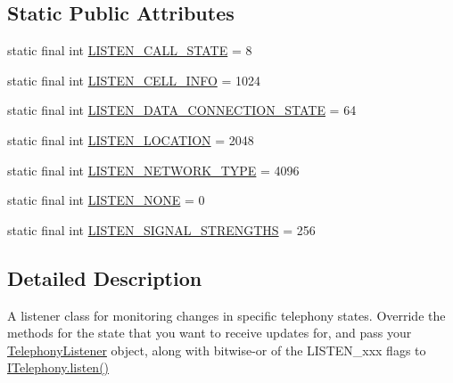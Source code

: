 \subsection*{Static Public Attributes}
\begin{DoxyCompactItemize}
\item 
static final int \hyperlink{classcom_1_1qualoutdoor_1_1recorder_1_1telephony_1_1TelephonyListener_a191d2575b8783002ee3e5d8cbadd6f34}{L\-I\-S\-T\-E\-N\-\_\-\-C\-A\-L\-L\-\_\-\-S\-T\-A\-T\-E} = 8
\item 
static final int \hyperlink{classcom_1_1qualoutdoor_1_1recorder_1_1telephony_1_1TelephonyListener_aa73af11a2afc13c7bfb8ce7e58b45f69}{L\-I\-S\-T\-E\-N\-\_\-\-C\-E\-L\-L\-\_\-\-I\-N\-F\-O} = 1024
\item 
static final int \hyperlink{classcom_1_1qualoutdoor_1_1recorder_1_1telephony_1_1TelephonyListener_a640f1efa08e7e0869335cfc47c3a2124}{L\-I\-S\-T\-E\-N\-\_\-\-D\-A\-T\-A\-\_\-\-C\-O\-N\-N\-E\-C\-T\-I\-O\-N\-\_\-\-S\-T\-A\-T\-E} = 64
\item 
static final int \hyperlink{classcom_1_1qualoutdoor_1_1recorder_1_1telephony_1_1TelephonyListener_a146371faf289ea1d3c019a9da50e6ba2}{L\-I\-S\-T\-E\-N\-\_\-\-L\-O\-C\-A\-T\-I\-O\-N} = 2048
\item 
static final int \hyperlink{classcom_1_1qualoutdoor_1_1recorder_1_1telephony_1_1TelephonyListener_adff97a5ff891440e844b1438c8160ec1}{L\-I\-S\-T\-E\-N\-\_\-\-N\-E\-T\-W\-O\-R\-K\-\_\-\-T\-Y\-P\-E} = 4096
\item 
static final int \hyperlink{classcom_1_1qualoutdoor_1_1recorder_1_1telephony_1_1TelephonyListener_a5d217cc158268f8c01738b0f51e1ce53}{L\-I\-S\-T\-E\-N\-\_\-\-N\-O\-N\-E} = 0
\item 
static final int \hyperlink{classcom_1_1qualoutdoor_1_1recorder_1_1telephony_1_1TelephonyListener_aab3f3a875e74a3b4d6eab7db23683372}{L\-I\-S\-T\-E\-N\-\_\-\-S\-I\-G\-N\-A\-L\-\_\-\-S\-T\-R\-E\-N\-G\-T\-H\-S} = 256
\end{DoxyCompactItemize}


\subsection{Detailed Description}
A listener class for monitoring changes in specific telephony states. Override the methods for the state that you want to receive updates for, and pass your \hyperlink{classcom_1_1qualoutdoor_1_1recorder_1_1telephony_1_1TelephonyListener}{Telephony\-Listener} object, along with bitwise-\/or of the L\-I\-S\-T\-E\-N\-\_\-xxx flags to \hyperlink{interfacecom_1_1qualoutdoor_1_1recorder_1_1telephony_1_1ITelephony_a2bf33ee65f59c2100442f6ba33fac113}{I\-Telephony.\-listen()} 

